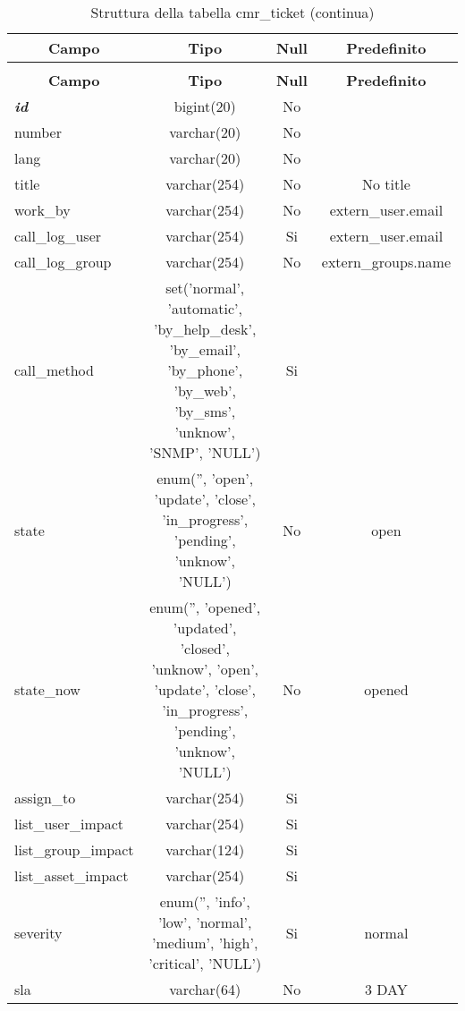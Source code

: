 %
%
 \begin{longtable}{|l|c|c|c|} 
 \caption{Struttura della tabella cmr\_ticket} \label{tab:cmr_ticket-structure} \\
 \hline \multicolumn{1}{|c|}{\textbf{Campo}} & \multicolumn{1}{|c|}{\textbf{Tipo}} & \multicolumn{1}{|c|}{\textbf{Null}} & \multicolumn{1}{|c|}{\textbf{Predefinito}} \\ \hline \hline
\endfirsthead
 \caption{Struttura della tabella cmr\_ticket (continua)} \\ 
 \hline \multicolumn{1}{|c|}{\textbf{Campo}} & \multicolumn{1}{|c|}{\textbf{Tipo}} & \multicolumn{1}{|c|}{\textbf{Null}} & \multicolumn{1}{|c|}{\textbf{Predefinito}} \\ \hline \hline \endhead \endfoot \textbf{\textit{id}} & bigint(20) &  No  &  \\ \hline 
number & varchar(20) &  No  &  \\ \hline 
lang & varchar(20) &  No  &  \\ \hline 
title & varchar(254) &  No  & No title \\ \hline 
work\_by & varchar(254) &  No  & extern\_user.email \\ \hline 
call\_log\_user & varchar(254) &  Si  & extern\_user.email \\ \hline 
call\_log\_group & varchar(254) &  No  & extern\_groups.name \\ \hline 
call\_method & set('normal', 'automatic', 'by\_help\_desk', 'by\_email', 'by\_phone', 'by\_web', 'by\_sms', 'unknow', 'SNMP', 'NULL') &  Si  &  \\ \hline 
state & enum('', 'open', 'update', 'close', 'in\_progress', 'pending', 'unknow', 'NULL') &  No  & open \\ \hline 
state\_now & enum('', 'opened', 'updated', 'closed', 'unknow', 'open', 'update', 'close', 'in\_progress', 'pending', 'unknow', 'NULL') &  No  & opened \\ \hline 
assign\_to & varchar(254) &  Si  &  \\ \hline 
list\_user\_impact & varchar(254) &  Si  &  \\ \hline 
list\_group\_impact & varchar(124) &  Si  &  \\ \hline 
list\_asset\_impact & varchar(254) &  Si  &  \\ \hline 
severity & enum('', 'info', 'low', 'normal', 'medium', 'high', 'critical', 'NULL') &  Si  & normal \\ \hline 
sla & varchar(64) &  No  & 3 DAY \\ \hline 

\end{longtable}
